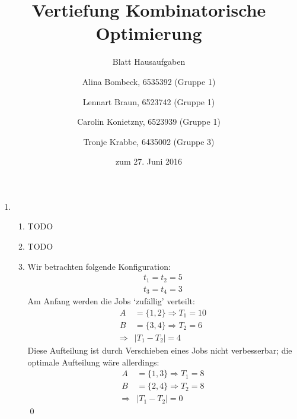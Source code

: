 \documentclass[a4paper]{scrartcl}
\title{Vertiefung Kombinatorische Optimierung}
\subtitle{Blatt {\blattnr} Hausaufgaben}
\author{%
    Alina Bombeck, 6535392 (Gruppe 1) \and
    Lennart Braun, 6523742 (Gruppe 1) \and
    Carolin Konietzny, 6523939 (Gruppe 1) \and
    Tronje Krabbe, 6435002 (Gruppe 3)
}
\date{zum 27. Juni 2016}
\begin{document}
\maketitle


\begin{enumerate}[label=\bfseries \arabic*.]
\item %
\begin{enumerate}
    \item %
        TODO

    \item %
        TODO

    \item %
        Wir betrachten folgende Konfiguration:
        \begin{align*}
            t_1 = t_2 = 5\\
            t_3 = t_4 = 3
        \end{align*}
        Am Anfang werden die Jobs `zufällig' verteilt:
        \begin{align*}
            A& = \{1,2\} \Rightarrow T_1 = 10\\
            B& = \{3,4\} \Rightarrow T_2 =  6\\
            \Rightarrow& |T_1 - T_2| = 4
        \end{align*}
        Diese Aufteilung ist durch Verschieben eines Jobs nicht verbesserbar;
        die optimale Aufteilung wäre allerdings:
        \begin{align*}
            A& = \{1,3\} \Rightarrow T_1 = 8\\
            B& = \{2,4\} \Rightarrow T_2 = 8\\
            \Rightarrow& |T_1 - T_2| = 0
        \end{align*}
        \qed
\end{enumerate}


\end{enumerate}
\end{document}
